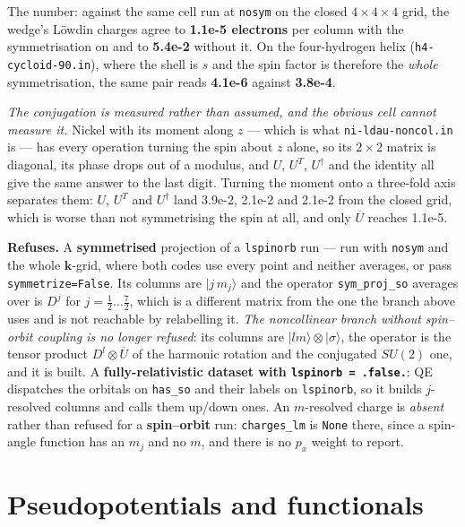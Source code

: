 \documentclass[11pt,a4paper]{article}
\newcommand{\code}[1]{\texttt{\small #1}}
\begin{document}
The number: against the same cell run at \code{nosym} on the closed
$4\times4\times4$ grid, the wedge's Löwdin charges agree to
\textbf{1.1e-5 electrons} per column with the symmetrisation on and to
\textbf{5.4e-2} without it. On the four-hydrogen helix
(\code{h4-cycloid-90.in}), where the shell is $s$ and the spin factor is
therefore the \emph{whole} symmetrisation, the same pair reads \textbf{4.1e-6}
against \textbf{3.8e-4}.

\emph{The conjugation is measured rather than assumed, and the obvious cell
cannot measure it.} Nickel with its moment along $z$ --- which is what
\code{ni-ldau-noncol.in} is --- has every operation turning the spin about $z$
alone, so its $2\times2$ matrix is diagonal, its phase drops out of a modulus,
and $U$, $U^{T}$, $U^{\dagger}$ and the identity all give the same answer to
the last digit. Turning the moment onto a three-fold axis separates them:
$U$, $U^{T}$ and $U^{\dagger}$ land 3.9e-2, 2.1e-2 and 2.1e-2 from the closed
grid, which is worse than not symmetrising the spin at all, and only
$\overline{U}$ reaches 1.1e-5.

\begin{refuses}
\textbf{Refuses.} A \textbf{symmetrised} projection of a \code{lspinorb}
run --- run with \code{nosym} and the whole $\mathbf k$-grid, where both codes
use every point and neither averages, or pass \code{symmetrize=False}. Its
columns are $|j\, m_j\rangle$ and the operator \code{sym\_proj\_so} averages
over is $D^j$ for $j = \tfrac12 \ldots \tfrac72$, which is a different matrix
from the one the branch above uses and is not reachable by relabelling it.
\emph{The noncollinear branch without spin--orbit coupling is no longer
refused}: its columns are $|l m\rangle \otimes |\sigma\rangle$, the operator is
the tensor product $D^l \otimes \overline{U}$ of the harmonic rotation and the
conjugated $SU(2)$ one, and it is built. A \textbf{fully-relativistic dataset with
\code{lspinorb = .false.}}: QE dispatches the orbitals on \code{has\_so} and
their labels on \code{lspinorb}, so it builds $j$-resolved columns and calls
them up/down ones. An $m$-resolved charge is \emph{absent} rather than refused
for a \textbf{spin--orbit} run: \code{charges\_lm} is \code{None} there, since a
spin-angle function has an $m_j$ and no $m$, and there is no $p_x$ weight to
report.
\end{refuses}

\section{Pseudopotentials and functionals}
\end{document}
